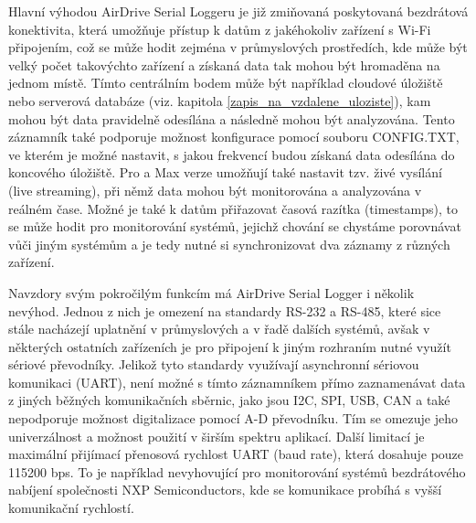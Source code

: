 Hlavní výhodou AirDrive Serial Loggeru je již zmiňovaná poskytovaná bezdrátová konektivita, která umožňuje přístup k datům z jakéhokoliv zařízení s Wi-Fi připojením, což se může hodit zejména v průmyslových  prostředích, kde může být velký počet takovýchto zařízení a získaná data tak mohou být hromaděna na jednom místě. Tímto centrálním bodem může být například cloudové úložiště nebo serverová databáze (viz. kapitola \ref{zapis_na_vzdalene_uloziste}), kam mohou být data pravidelně odesílána a následně mohou být analyzována. Tento záznamník také podporuje možnost konfigurace pomocí souboru CONFIG.TXT, ve kterém je možné nastavit, s jakou frekvencí budou získaná data odesílána do koncového úložiště. Pro a Max verze umožňují také nastavit tzv. živé vysílání (live streaming), při němž data mohou být monitorována a analyzována v reálném čase. Možné je také k datům přiřazovat časová razítka (timestamps), to se může hodit pro monitorování systémů, jejichž chování se chystáme porovnávat vůči jiným systémům a je tedy nutné si synchronizovat dva záznamy z různých zařízení. \cite{keelog_airdrive_serial_datalogger}

Navzdory svým pokročilým funkcím má AirDrive Serial Logger i několik nevýhod. Jednou z nich je omezení na standardy RS-232 a RS-485, které sice stále nacházejí uplatnění v průmyslových a v řadě dalších systémů, avšak v některých ostatních zařízeních je pro připojení k jiným rozhraním nutné využít sériové převodníky. Jelikož tyto standardy využívají asynchronní sériovou komunikaci (UART), není možné s tímto záznamníkem přímo zaznamenávat data z jiných běžných komunikačních sběrnic, jako jsou I2C, SPI, USB, CAN a také nepodporuje možnost digitalizace pomocí A-D převodníku. Tím se omezuje jeho univerzálnost a možnost použití v širším spektru aplikací. Další limitací je maximální přijímací přenosová rychlost UART (baud rate), která dosahuje pouze 115200 bps. To je například nevyhovující pro monitorování systémů bezdrátového nabíjení společnosti NXP Semiconductors, kde se komunikace probíhá s vyšší komunikační rychlostí. \cite{keelog_airdrive_serial_datalogger}

